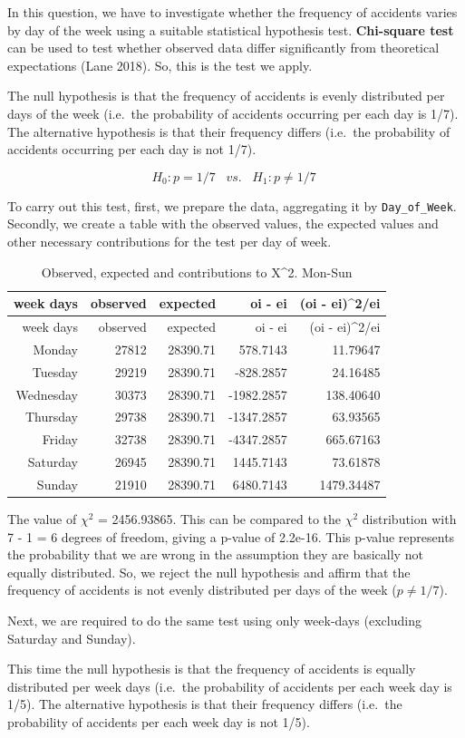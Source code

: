 \documentclass[]{article}
\begin{document}
In this question, we have to investigate whether the frequency of
accidents varies by day of the week using a suitable statistical
hypothesis test. \textbf{Chi-square test} can be used to test whether
observed data differ significantly from theoretical expectations (Lane
2018). So, this is the test we apply.

The null hypothesis is that the frequency of accidents is evenly
distributed per days of the week (i.e.~the probability of accidents
occurring per each day is 1/7). The alternative hypothesis is that their
frequency differs (i.e.~the probability of accidents occurring per each
day is not 1/7).

\[H_{0}: p=1/7\;\;\;vs.\;\;\;H_{1}:p\neq1/7\;\] \pagebreak

To carry out this test, first, we prepare the data, aggregating it by
\texttt{Day\_of\_Week}. Secondly, we create a table with the observed
values, the expected values and other necessary contributions for the
test per day of week.

\begin{longtable}[]{@{}rrrrr@{}}
\caption{Observed, expected and contributions to X\^{}2.
Mon-Sun}\tabularnewline
\toprule
week days & observed & expected & oi - ei & (oi -
ei)\^{}2/ei\tabularnewline
\midrule
\endfirsthead
\toprule
week days & observed & expected & oi - ei & (oi -
ei)\^{}2/ei\tabularnewline
\midrule
\endhead
Monday & 27812 & 28390.71 & 578.7143 & 11.79647\tabularnewline
Tuesday & 29219 & 28390.71 & -828.2857 & 24.16485\tabularnewline
Wednesday & 30373 & 28390.71 & -1982.2857 & 138.40640\tabularnewline
Thursday & 29738 & 28390.71 & -1347.2857 & 63.93565\tabularnewline
Friday & 32738 & 28390.71 & -4347.2857 & 665.67163\tabularnewline
Saturday & 26945 & 28390.71 & 1445.7143 & 73.61878\tabularnewline
Sunday & 21910 & 28390.71 & 6480.7143 & 1479.34487\tabularnewline
\bottomrule
\end{longtable}

The value of \(\chi ^2\) = 2456.93865. This can be compared to the
\(\chi ^2\) distribution with 7 - 1 = 6 degrees of freedom, giving a
p-value of 2.2e-16. This p-value represents the probability that we are
wrong in the assumption they are basically not equally distributed. So,
we reject the null hypothesis and affirm that the frequency of accidents
is not evenly distributed per days of the week (\(p\neq1/7\)).

Next, we are required to do the same test using only week-days
(excluding Saturday and Sunday).

This time the null hypothesis is that the frequency of accidents is
equally distributed per week days (i.e.~the probability of accidents per
each week day is 1/5). The alternative hypothesis is that their
frequency differs (i.e.~the probability of accidents per each week day
is not 1/5).
\end{document}
